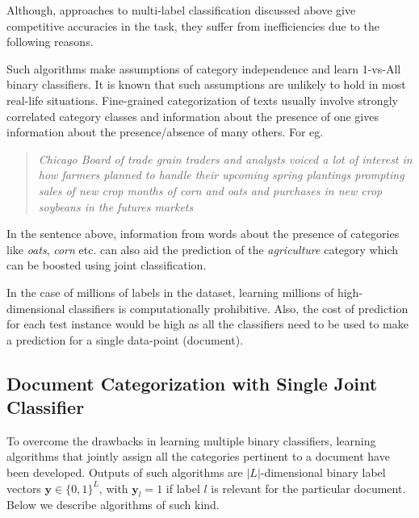 \hfill 
\break
Although, approaches to multi-label classification discussed above 
give competitive accuracies in the task, they suffer from 
inefficiencies due to the following reasons.

Such algorithms make assumptions of category independence and learn 
1-vs-All binary classifiers. It is known that such assumptions are unlikely 
to hold in most real-life situations. Fine-grained 
categorization of texts usually involve strongly correlated category 
classes and information about the presence of one gives information 
about the presence/absence of many others. For eg.  
\begin{quote} 
\emph{Chicago Board of trade grain traders and analysts voiced a lot of interest in how farmers planned to handle their upcoming spring plantings prompting sales of new crop months of corn and oats and purchases in new crop soybeans in the futures markets}
\end{quote}
In the sentence above, information from words about the presence of categories like \emph{oats}, \emph{corn} etc. can also aid the prediction of the \emph{agriculture} category which can be boosted using joint classification.

In the case of millions of labels in the dataset, learning millions of high-dimensional classifiers is computationally prohibitive. Also, the cost of prediction for each test instance would be high as all the classifiers need to be used to make a prediction for a single data-point (document). 

\subsection{Document Categorization with Single Joint Classifier}
To overcome the drawbacks in learning multiple binary classifiers, 
learning algorithms that jointly assign all the categories pertinent to
a document have been developed. Outputs of such algorithms are 
$|L|$-dimensional binary label vectors $\boldsymbol{y} \in \{0, 1\}^{L}$, 
with $\boldsymbol{y}_{l} = 1$ if label $l$ is relevant for the 
particular document. Below we describe algorithms of such kind.

